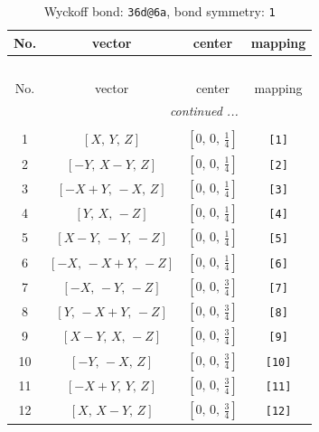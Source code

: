 \documentclass[fleqn,8pt]{jsarticle}
\begin{document}
\begin{longtable}{cccc}
\caption{Wyckoff bond: {\tt 36d@6a}, bond symmetry: {\tt 1}}
 \\
 \hline \hline
No. & vector & center & mapping \\ \hline \endfirsthead

\multicolumn{3}{l}{\tablename\ \thetable{}} \\
 \hline \hline
No. & vector & center & mapping \\ \hline \endhead

 \hline \hline
\multicolumn{3}{r}{\footnotesize\it continued ...} \\ \endfoot

 \hline \hline
\multicolumn{3}{r}{} \\ \endlastfoot

1 & $\left[ X,\, Y,\, Z \right]$ & $\left[ 0,\, 0,\, \frac{1}{4} \right]$ & {\tt [1]} \\ \hline
2 & $\left[ - Y,\, X - Y,\, Z \right]$ & $\left[ 0,\, 0,\, \frac{1}{4} \right]$ & {\tt [2]} \\ \hline
3 & $\left[ - X + Y,\, - X,\, Z \right]$ & $\left[ 0,\, 0,\, \frac{1}{4} \right]$ & {\tt [3]} \\ \hline
4 & $\left[ Y,\, X,\, - Z \right]$ & $\left[ 0,\, 0,\, \frac{1}{4} \right]$ & {\tt [4]} \\ \hline
5 & $\left[ X - Y,\, - Y,\, - Z \right]$ & $\left[ 0,\, 0,\, \frac{1}{4} \right]$ & {\tt [5]} \\ \hline
6 & $\left[ - X,\, - X + Y,\, - Z \right]$ & $\left[ 0,\, 0,\, \frac{1}{4} \right]$ & {\tt [6]} \\ \hline
7 & $\left[ - X,\, - Y,\, - Z \right]$ & $\left[ 0,\, 0,\, \frac{3}{4} \right]$ & {\tt [7]} \\ \hline
8 & $\left[ Y,\, - X + Y,\, - Z \right]$ & $\left[ 0,\, 0,\, \frac{3}{4} \right]$ & {\tt [8]} \\ \hline
9 & $\left[ X - Y,\, X,\, - Z \right]$ & $\left[ 0,\, 0,\, \frac{3}{4} \right]$ & {\tt [9]} \\ \hline
10 & $\left[ - Y,\, - X,\, Z \right]$ & $\left[ 0,\, 0,\, \frac{3}{4} \right]$ & {\tt [10]} \\ \hline
11 & $\left[ - X + Y,\, Y,\, Z \right]$ & $\left[ 0,\, 0,\, \frac{3}{4} \right]$ & {\tt [11]} \\ \hline
12 & $\left[ X,\, X - Y,\, Z \right]$ & $\left[ 0,\, 0,\, \frac{3}{4} \right]$ & {\tt [12]} \\
\end{longtable}
\end{document}
